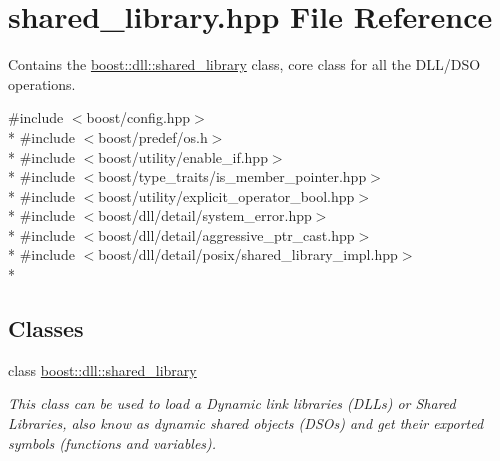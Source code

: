\hypertarget{a00726}{}\section{shared\+\_\+library.\+hpp File Reference}
\label{a00726}


Contains the \hyperlink{a00271}{boost\+::dll\+::shared\+\_\+library} class, core class for all the D\+L\+L/\+D\+SO operations.  


{\ttfamily \#include $<$boost/config.\+hpp$>$}\\*
{\ttfamily \#include $<$boost/predef/os.\+h$>$}\\*
{\ttfamily \#include $<$boost/utility/enable\+\_\+if.\+hpp$>$}\\*
{\ttfamily \#include $<$boost/type\+\_\+traits/is\+\_\+member\+\_\+pointer.\+hpp$>$}\\*
{\ttfamily \#include $<$boost/utility/explicit\+\_\+operator\+\_\+bool.\+hpp$>$}\\*
{\ttfamily \#include $<$boost/dll/detail/system\+\_\+error.\+hpp$>$}\\*
{\ttfamily \#include $<$boost/dll/detail/aggressive\+\_\+ptr\+\_\+cast.\+hpp$>$}\\*
{\ttfamily \#include $<$boost/dll/detail/posix/shared\+\_\+library\+\_\+impl.\+hpp$>$}\\*
\subsection*{Classes}
\begin{DoxyCompactItemize}
\item 
class \hyperlink{a00271}{boost\+::dll\+::shared\+\_\+library}
\begin{DoxyCompactList}\small\item\em This class can be used to load a Dynamic link libraries (D\+LL\textquotesingle{}s) or Shared Libraries, also know as dynamic shared objects (D\+SO\textquotesingle{}s) and get their exported symbols (functions and variables). \end{DoxyCompactList}\end{DoxyCompactItemize}
